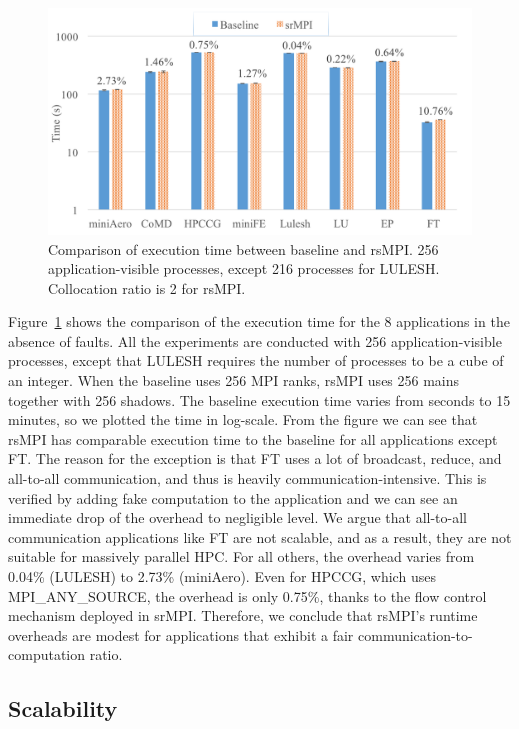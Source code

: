 \begin{figure}[!t]
  \begin{center}
      \includegraphics[width=0.6\columnwidth]{Figures/runtime_overhead}
  \end{center}
  \caption{Comparison of execution time between baseline and rsMPI. 256 application-visible processes, except 216 processes for LULESH. Collocation ratio is 2 for rsMPI.}
  \label{fig:runtime_overhead}
\end{figure}

Figure~\ref{fig:runtime_overhead} shows the comparison of the execution time for the 8 applications in the absence of faults. All the experiments are conducted with 256 application-visible processes, except that LULESH requires the number of processes to be a cube of an integer. When the baseline uses 256 MPI ranks, rsMPI uses 256 mains together with 256 shadows. The baseline execution time varies from seconds to 15 minutes, so we plotted the time in log-scale. 
From the figure we can see that rsMPI has comparable execution time to the baseline for all applications except FT. The reason for the exception is that FT uses a lot of broadcast, reduce, and all-to-all communication, and thus is heavily communication-intensive. This is verified by adding fake computation to the application and we can see an immediate drop of the overhead to negligible level. 
We argue that all-to-all communication applications like FT are not scalable, and as a result, they are not suitable for massively parallel HPC. 
For all others, the overhead varies from 0.04\% (LULESH) to 2.73\% (miniAero). Even for HPCCG, which uses MPI\_ANY\_SOURCE, the overhead is only 0.75\%, thanks to the flow control mechanism deployed in srMPI. 
Therefore, we conclude that rsMPI's runtime overheads are modest for applications that exhibit a fair communication-to-computation ratio.



\subsection{Scalability}

